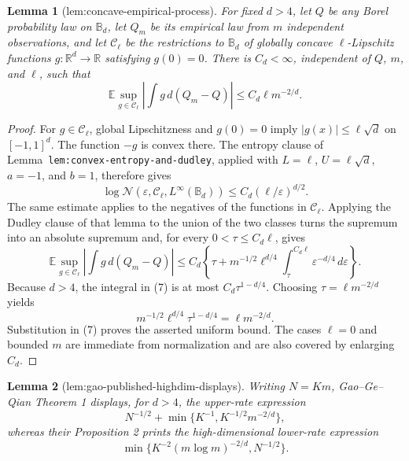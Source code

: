 \documentclass{article}
\newtheorem{lemma}{Lemma}
\begin{document}
\begin{lemma}[lem:concave-empirical-process]\label{lem:concave-empirical-process}
For fixed \(d>4\), let \(Q\) be any Borel probability law on \(\mathbb B_d\), let \(Q_m\) be its empirical law from \(m\) independent observations, and let \(\mathcal C_\ell\) be the restrictions to \(\mathbb B_d\) of globally concave \(\ell\)-Lipschitz functions \(g:\mathbb R^d\to\mathbb R\) satisfying \(g(0)=0\). There is \(C_d<\infty\), independent of \(Q\), \(m\), and \(\ell\), such that
\[
\mathbb E\sup_{g\in\mathcal C_\ell}\left|\int g\,d(Q_m-Q)\right|
\le C_d\ell m^{-2/d}.
\]
\end{lemma}
\begin{proof}
For \(g\in\mathcal C_\ell\), global Lipschitzness and \(g(0)=0\) imply \(|g(x)|\le\ell\sqrt d\) on \([-1,1]^d\). The function \(-g\) is convex there. The entropy clause of Lemma~\texttt{lem:convex-entropy-and-dudley}, applied with \(L=\ell\), \(U=\ell\sqrt d\), \(a=-1\), and \(b=1\), therefore gives
\[
\log \mathcal N(\varepsilon,\mathcal C_\ell,L^\infty(\mathbb B_d))
\le C_d(\ell/\varepsilon)^{d/2}. \tag{6}
\]
The same estimate applies to the negatives of the functions in \(\mathcal C_\ell\). Applying the Dudley clause of that lemma to the union of the two classes turns the supremum into an absolute supremum and, for every \(0<\tau\le C_d\ell\), gives
\[
\mathbb E\sup_{g\in\mathcal C_\ell}\left|\int g\,d(Q_m-Q)\right|
\le C_d\left\{\tau+m^{-1/2}\ell^{d/4}\int_\tau^{C_d\ell}
\varepsilon^{-d/4}\,d\varepsilon\right\}. \tag{7}
\]
Because \(d>4\), the integral in (7) is at most \(C_d\tau^{1-d/4}\). Choosing \(\tau=\ell m^{-2/d}\) yields
\[
m^{-1/2}\ell^{d/4}\tau^{1-d/4}=\ell m^{-2/d}.
\]
Substitution in (7) proves the asserted uniform bound. The cases \(\ell=0\) and bounded \(m\) are immediate from normalization and are also covered by enlarging \(C_d\).
\end{proof}

\begin{lemma}[lem:gao-published-highdim-displays]\label{lem:gao-published-highdim-displays}
Writing \(N=Km\), Gao--Ge--Qian Theorem 1 displays, for \(d>4\), the upper-rate expression
\[
N^{-1/2}+\min\{K^{-1},K^{-1/2}m^{-2/d}\},
\]
whereas their Proposition 2 prints the high-dimensional lower-rate expression
\[
\min\{K^{-2}(m\log m)^{-2/d},N^{-1/2}\}.
\]
\end{lemma}
\end{document}
